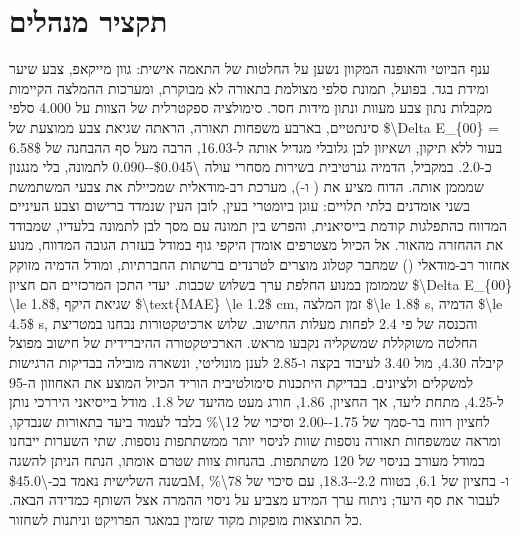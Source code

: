 \makecoverpage

\chapter*{תקציר מנהלים}
\begingroup{}
ענף הביוטי והאופנה המקוון נשען על החלטות של התאמה אישית: גוון מייקאפ, צבע שיער ומידת בגד. בפועל, תמונת סלפי מצולמת בתאורה לא מבוקרת, ומערכות ההמלצה הקיימות מקבלות נתון צבע מעוות ונתון מידות חסר. סימולציה ספקטרלית של הצוות על \num{4,000} סלפי סינתטיים, בארבע משפחות תאורה, הראתה שגיאת צבע ממוצעת של \num{$\Delta E_{00} = 6.58$} בעור ללא תיקון, ושאיזון לבן גלובלי מגדיל אותה ל-\num{16.03}, הרבה מעל סף ההבחנה של כ-\num{2.0}. במקביל, הדמיה גנרטיבית בשירות מסחרי עולה \num{\$0.045--0.090} לתמונה, בלי מנגנון שמממן אותה.
הדוח מציע את  ( ו-), מערכת רב-מודאלית שמכיילת את צבעי המשתמשת בשני אומדנים בלתי תלויים: עוגן ביומטרי בעין, לובן העין שנמדד ברישום וצבע העיניים המדווח כהתפלגות קודמת בייסיאנית, והפרש בין תמונה עם מסך לבן לתמונה בלעדיו, שמבודד את ההחזרה מהאור. אל הכיול מצטרפים אומדן היקפי גוף במודל  בעזרת הגובה המדווח, מנוע אחזור רב-מודאלי () שמחבר קטלוג מוצרים לטרנדים ברשתות החברתיות, ומודל הדמיה מזוקק שממומן במנוע החלפת ערך בשלוש שכבות.
יעדי התכן המרכזיים הם חציון \num{$\Delta E_{00} \le 1.8$}, שגיאת היקף \num{$\text{MAE} \le 1.2$ cm}, זמן המלצה \num{$\le 1.8$ s}, הדמיה \num{$\le 4.5$ s}, והכנסה של פי \num{2.4} לפחות מעלות החישוב. שלוש ארכיטקטורות נבחנו במטריצת החלטה משוקללת שמשקליה נקבעו מראש. הארכיטקטורה ההיברידית של חישוב מפוצל קיבלה \num{4.30}, מול \num{3.40} לעיבוד בקצה ו-\num{2.85} לענן מונוליטי, ונשארה מובילה בבדיקות הרגישות למשקלים ולציונים. בבדיקת היתכנות סימולטיבית הוריד הכיול המוצע את האחוזון ה-\num{95} ל-\num{4.25}, מתחת ליעד, אך החציון, \num{1.86}, חורג מעט מהיעד של \num{1.8}. מודל בייסיאני היררכי נותן לחציון רווח בר-סמך של \num{1.75--2.00} וסיכוי של \num{12\%} בלבד לעמוד ביעד בתאורות שנבדקו, ומראה שמשפחות תאורה נוספות שוות לניסוי יותר ממשתתפות נוספות. שתי השערות ייבחנו במודל מעורב בניסוי של \num{120} משתתפות. בהנחות צוות שטרם אומתו, הנתח הניתן להשגה בשנה השלישית נאמד בכ-\num{\$45.0M}, ו- בחציון של \num{6.1}, בטווח \num{2.2--18.3}, עם סיכוי של \num{78\%} לעבור את סף היעד; ניתוח ערך המידע מצביע על ניסוי ההמרה אצל השותף כמדידה הבאה. כל התוצאות מופקות מקוד שזמין במאגר הפרויקט וניתנות לשחזור.
